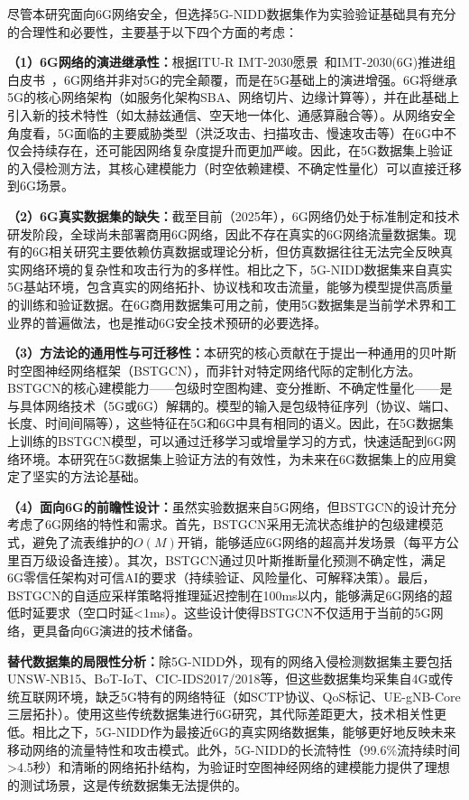 尽管本研究面向6G网络安全，但选择5G-NIDD数据集作为实验验证基础具有充分的合理性和必要性，主要基于以下四个方面的考虑：

\textbf{（1）6G网络的演进继承性：}根据ITU-R IMT-2030愿景~\cite{ITU_IMT2030_2023}和IMT-2030(6G)推进组白皮书~\cite{IMT2030_6G_WhitePaper_2021}，6G网络并非对5G的完全颠覆，而是在5G基础上的演进增强。6G将继承5G的核心网络架构（如服务化架构SBA、网络切片、边缘计算等），并在此基础上引入新的技术特性（如太赫兹通信、空天地一体化、通感算融合等）。从网络安全角度看，5G面临的主要威胁类型（洪泛攻击、扫描攻击、慢速攻击等）在6G中不仅会持续存在，还可能因网络复杂度提升而更加严峻。因此，在5G数据集上验证的入侵检测方法，其核心建模能力（时空依赖建模、不确定性量化）可以直接迁移到6G场景。

\textbf{（2）6G真实数据集的缺失：}截至目前（2025年），6G网络仍处于标准制定和技术研发阶段，全球尚未部署商用6G网络，因此不存在真实的6G网络流量数据集。现有的6G相关研究主要依赖仿真数据或理论分析，但仿真数据往往无法完全反映真实网络环境的复杂性和攻击行为的多样性。相比之下，5G-NIDD数据集来自真实5G基站环境，包含真实的网络拓扑、协议栈和攻击流量，能够为模型提供高质量的训练和验证数据。在6G商用数据集可用之前，使用5G数据集是当前学术界和工业界的普遍做法，也是推动6G安全技术预研的必要选择。

\textbf{（3）方法论的通用性与可迁移性：}本研究的核心贡献在于提出一种通用的贝叶斯时空图神经网络框架（BSTGCN），而非针对特定网络代际的定制化方法。BSTGCN的核心建模能力——包级时空图构建、变分推断、不确定性量化——是与具体网络技术（5G或6G）解耦的。模型的输入是包级特征序列（协议、端口、长度、时间间隔等），这些特征在5G和6G中具有相同的语义。因此，在5G数据集上训练的BSTGCN模型，可以通过迁移学习或增量学习的方式，快速适配到6G网络环境。本研究在5G数据集上验证方法的有效性，为未来在6G数据集上的应用奠定了坚实的方法论基础。

\textbf{（4）面向6G的前瞻性设计：}虽然实验数据来自5G网络，但BSTGCN的设计充分考虑了6G网络的特性和需求。首先，BSTGCN采用无流状态维护的包级建模范式，避免了流表维护的$O(M)$开销，能够适应6G网络的超高并发场景（每平方公里百万级设备连接）。其次，BSTGCN通过贝叶斯推断量化预测不确定性，满足6G零信任架构对可信AI的要求（持续验证、风险量化、可解释决策）。最后，BSTGCN的自适应采样策略将推理延迟控制在100ms以内，能够满足6G网络的超低时延要求（空口时延<1ms）。这些设计使得BSTGCN不仅适用于当前的5G网络，更具备向6G演进的技术储备。

\textbf{替代数据集的局限性分析：}除5G-NIDD外，现有的网络入侵检测数据集主要包括UNSW-NB15、BoT-IoT、CIC-IDS2017/2018等，但这些数据集均采集自4G或传统互联网环境，缺乏5G特有的网络特征（如SCTP协议、QoS标记、UE-gNB-Core三层拓扑）。使用这些传统数据集进行6G研究，其代际差距更大，技术相关性更低。相比之下，5G-NIDD作为最接近6G的真实网络数据集，能够更好地反映未来移动网络的流量特性和攻击模式。此外，5G-NIDD的长流特性（99.6\%流持续时间>4.5秒）和清晰的网络拓扑结构，为验证时空图神经网络的建模能力提供了理想的测试场景，这是传统数据集无法提供的。

